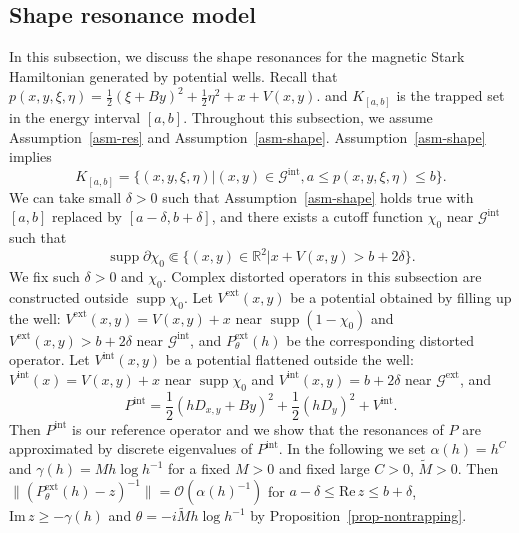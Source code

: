 \documentclass{article}
\theoremstyle{plain}
\theoremstyle{definition}
\theoremstyle{remark}
\newtheorem{remark}[prop]{Remark}
\newcommand{\RR}{\mathbb{R}}
\newcommand{\supp}{\mathop{\mathrm{supp}}}
\newcommand{\RE}{\mathrm{Re}\,}
\newcommand{\IM}{\mathrm{Im}\,}
\begin{document}
\subsection{Shape resonance model}
In this subsection, we discuss the shape resonances for the magnetic Stark Hamiltonian generated by potential wells. 
Recall that $p(x, y, \xi, \eta)=\frac{1}{2}(\xi+By)^2+\frac{1}{2}\eta^2+x+V(x, y)$. 
and $K_{[a,b]}$ is the trapped set in the energy interval $[a,b]$. 
Throughout this subsection, we assume Assumption~\ref{asm-res} and Assumption~\ref{asm-shape}. 
Assumption~\ref{asm-shape} implies 
\[
K_{[a,b]}=\{(x, y,\xi, \eta)|(x, y)\in \mathcal{G}^{\mathrm{int}}, a\le p(x, y, \xi, \eta)\le b\}.
\] 
We can take small $\delta>0$ such that Assumption~\ref{asm-shape} holds true with $[a,b]$ replaced by $[a-\delta, b+\delta]$, 
and there exists a cutoff function $\chi_0$ near $\mathcal{G}^{\mathrm{int}}$ such that 
\[
\supp \partial \chi_0 \Subset \{(x, y)\in \RR^2|x+V(x, y)>b+2\delta\}.
\] 
We fix such $\delta>0$ and $\chi_0$. 
Complex distorted operators in this subsection are constructed outside $\supp \chi_0$. 
Let $V^{\mathrm{ext}}(x, y)$ be a potential obtained by filling up the well: 
$V^{\mathrm{ext}}(x, y)=V(x, y)+x$ near $\supp (1-\chi_0)$ and 
$V^{\mathrm{ext}}(x, y)>b+2\delta$ near $\mathcal{G}^{\mathrm{int}}$, 
and $P^{\mathrm{ext}}_{\theta}(h)$ be the corresponding distorted operator.
Let $V^{\mathrm{int}}(x, y)$ be a potential flattened outside the well: 
$V^{\mathrm{int}}(x)=V(x, y)+x$ near $\supp \chi_0$ 
and $V^{\mathrm{int}}(x, y)=b+2\delta$ near $\mathcal{G}^{\mathrm{ext}}$, 
and 
\[
P^{\mathrm{int}}=\frac{1}{2}(hD_{x, y}+By)^2+\frac{1}{2}(hD_y)^2+V^{\mathrm{int}}.
\]
Then $P^{\mathrm{int}}$ is our reference operator and we show that the resonances of $P$ are approximated by discrete eigenvalues of 
$P^{\mathrm{int}}$. 
In the following we set $\alpha(h)=h^C$ and $\gamma(h)=Mh\log h^{-1}$
for a fixed $M>0$ and fixed large $C>0$, $\widetilde{M}>0$. 
Then 
$\|(P^{\mathrm{ext}}_{\theta}(h)-z)^{-1}\|=\mathcal{O}(\alpha(h)^{-1})$ 
for $a-\delta \le \RE z \le b+\delta$, $\IM z \ge -\gamma(h)$ 
and $\theta =-i\widetilde{M}h \log h^{-1}$ by Proposition~\ref{prop-nontrapping}.  
\end{document}
